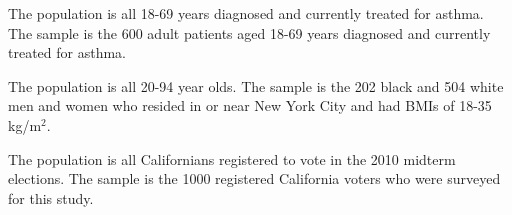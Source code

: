 {The population is all 18-69 years diagnosed and currently treated for asthma. The sample is the 600 adult patients aged 18-69 years diagnosed and currently treated for asthma.}

%

{
{The population is all 20-94 year olds. The sample is the 202 black and 504 white men and women who resided in or near New York City and had BMIs of 18-35 kg/m$^2$.}}

%

{
{The population is all Californians registered to vote in the 2010 midterm elections. The sample is the 1000 registered California voters who were surveyed for this study.}}

%


